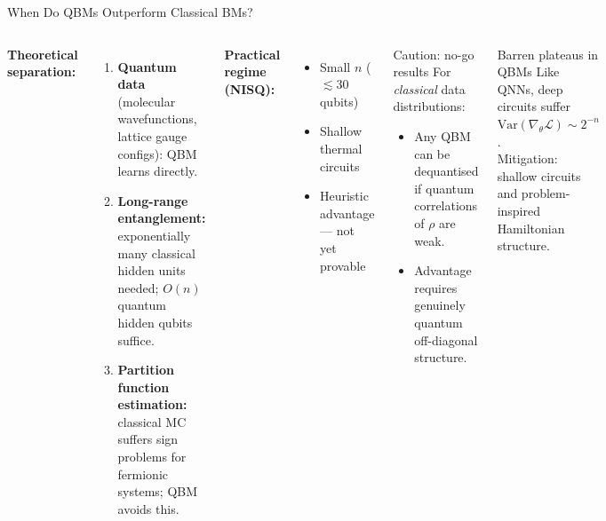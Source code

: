 \documentclass[aspectratio=169,10pt]{beamer}
\begin{document}
\begin{frame}{When Do QBMs Outperform Classical BMs?}
  \begin{columns}[T]
      \textbf{Theoretical separation:}
      \begin{enumerate}\small\itemsep1pt
        \item \textbf{Quantum data} (molecular wavefunctions,
              lattice gauge configs): QBM learns directly.
        \item \textbf{Long-range entanglement:}
              exponentially many classical hidden units needed;
              $O(n)$ quantum hidden qubits suffice.
        \item \textbf{Partition function estimation:}
              classical MC suffers sign problems for
              fermionic systems; QBM avoids this.
      \end{enumerate}
      \textbf{Practical regime (NISQ):}
      \begin{itemize}\small\itemsep0pt
        \item Small $n$ ($\lesssim 30$ qubits)
        \item Shallow thermal circuits
        \item Heuristic advantage — not yet provable
      \end{itemize}
      \begin{alertblock}{Caution: no-go results}
        For \emph{classical} data distributions:
        \begin{itemize}\small\itemsep1pt
          \item Any QBM can be dequantised if
                quantum correlations of $\rho$ are weak.
          \item Advantage requires genuinely
                quantum off-diagonal structure.
        \end{itemize}
      \end{alertblock}
      \vspace{0.1cm}
      \begin{block}{Barren plateaus in QBMs}
        {\small Like QNNs, deep circuits suffer
        $\mathrm{Var}(\nabla_\theta\mathcal{L})\sim 2^{-n}$.\\
        Mitigation: shallow circuits and
        problem-inspired Hamiltonian structure.}
      \end{block}
  \end{columns}
\end{frame}
\end{document}
